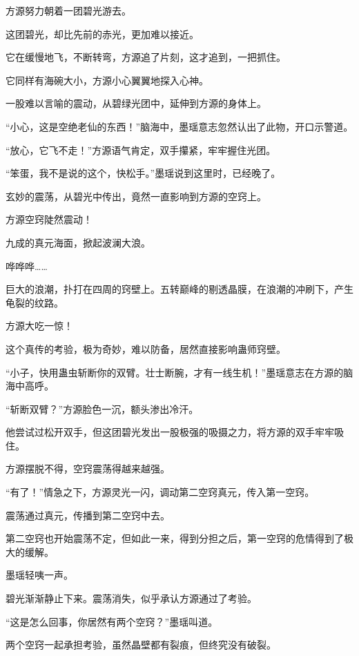 
\begin{this_body}



方源努力朝着一团碧光游去。

这团碧光，却比先前的赤光，更加难以接近。

它在缓慢地飞，不断转弯，方源追了片刻，这才追到，一把抓住。

它同样有海碗大小，方源小心翼翼地探入心神。

一股难以言喻的震动，从碧绿光团中，延伸到方源的身体上。

“小心，这是空绝老仙的东西！”脑海中，墨瑶意志忽然认出了此物，开口示警道。

“放心，它飞不走！”方源语气肯定，双手攥紧，牢牢握住光团。

“笨蛋，我不是说的这个，快松手。”墨瑶说到这里时，已经晚了。

玄妙的震荡，从碧光中传出，竟然一直影响到方源的空窍上。

方源空窍陡然震动！

九成的真元海面，掀起波澜大浪。

哗哗哗……

巨大的浪潮，扑打在四周的窍壁上。五转巅峰的剔透晶膜，在浪潮的冲刷下，产生龟裂的纹路。

方源大吃一惊！

这个真传的考验，极为奇妙，难以防备，居然直接影响蛊师窍壁。

“小子，快用蛊虫斩断你的双臂。壮士断腕，才有一线生机！”墨瑶意志在方源的脑海中高呼。

“斩断双臂？”方源脸色一沉，额头渗出冷汗。

他尝试过松开双手，但这团碧光发出一股极强的吸摄之力，将方源的双手牢牢吸住。

方源摆脱不得，空窍震荡得越来越强。

“有了！”情急之下，方源灵光一闪，调动第二空窍真元，传入第一空窍。

震荡通过真元，传播到第二空窍中去。

第二空窍也开始震荡不定，但如此一来，得到分担之后，第一空窍的危情得到了极大的缓解。

墨瑶轻咦一声。

碧光渐渐静止下来。震荡消失，似乎承认方源通过了考验。

“这是怎么回事，你居然有两个空窍？”墨瑶叫道。

两个空窍一起承担考验，虽然晶壁都有裂痕，但终究没有破裂。


\end{this_body}

